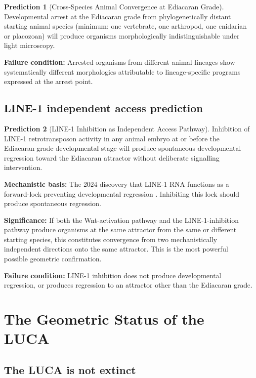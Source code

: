 \documentclass[12pt, a4paper]{article}
\theoremstyle{definition}
\newtheorem{prediction}{Prediction}[section]
\theoremstyle{remark}
\begin{document}
\begin{prediction}[Cross-Species Animal Convergence at
Ediacaran Grade]
Developmental arrest at the Ediacaran grade from
phylogenetically distant starting animal species (minimum:
one vertebrate, one arthropod, one cnidarian or placozoan)
will produce organisms morphologically indistinguishable
under light microscopy.

\textbf{Failure condition:} Arrested organisms from
different animal lineages show systematically different
morphologies attributable to lineage-specific programs
expressed at the arrest point.
\end{prediction}

\subsection{LINE-1 independent access prediction}

\begin{prediction}[LINE-1 Inhibition as Independent Access
Pathway]
Inhibition of LINE-1 retrotransposon activity in any animal
embryo at or before the Ediacaran-grade developmental stage
will produce spontaneous developmental regression toward the
Ediacaran attractor without deliberate signalling
intervention.

\textbf{Mechanistic basis:} The 2024 discovery that LINE-1
RNA functions as a forward-lock preventing developmental
regression \cite{line1_2024}. Inhibiting this lock should
produce spontaneous regression.

\textbf{Significance:} If both the Wnt-activation pathway
and the LINE-1-inhibition pathway produce organisms at the
same attractor from the same or different starting species,
this constitutes convergence from two mechanistically
independent directions onto the same attractor. This is the
most powerful possible geometric confirmation.

\textbf{Failure condition:} LINE-1 inhibition does not
produce developmental regression, or produces regression to
an attractor other than the Ediacaran grade.
\end{prediction}

\section{The Geometric Status of the LUCA}

\subsection{The LUCA is not extinct}
\end{document}
